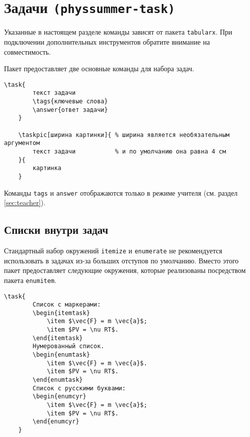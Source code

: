 \section{Задачи \texttt{(physsummer-task)}}

Указанные в настоящем разделе команды зависят от пакета \texttt{tabularx}. При подключении дополнительных
инструментов обратите внимание на совместимость.

Пакет предоставляет две основные команды для набора задач.

\begin{lstlisting}[gobble = 4]
    \task{
        текст задачи
        \tags{ключевые слова}
        \answer{ответ задачи}
    }

    \taskpic[ширина картинки]{ % ширина является необязательным аргументом
        текст задачи           % и по умолчанию она равна 4 см
    }{
        картинка
    }
\end{lstlisting}

Команды \texttt{tags} и \texttt{answer} отображаются только в режиме учителя (см. раздел
\ref{sec:teacher}).


        
\subsection{Списки внутри задач}

Стандартный набор окружений \texttt{itemize} и \texttt{enumerate} не рекомендуется использовать в
задачах из-за больших отступов по умолчанию. Вместо этого пакет предоставляет следующие окружения,
которые реализованы посредством пакета \texttt{enumitem}.

\begin{lstlisting}[gobble = 3]
    \task{
        Список с маркерами:
        \begin{itemtask}
            \item $\vec{F} = m \vec{a}$;
            \item $PV = \nu RT$.
        \end{itemtask}
        Нумерованный список.
        \begin{enumtask}
            \item $\vec{F} = m \vec{a}$.
            \item $PV = \nu RT$.
        \end{enumtask}
        Список с русскими буквами:
        \begin{enumcyr}
            \item $\vec{F} = m \vec{a}$;
            \item $PV = \nu RT$.
        \end{enumcyr}
    }
\end{lstlisting}

